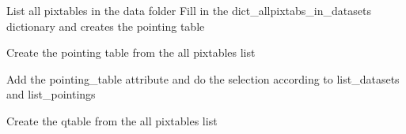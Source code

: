\documentclass[letterpaper,10pt,english]{sphinxmanual}
\begin{document}
\begin{fulllineitems}
\begin{fulllineitems}
\label{\detokenize{api/pymusepipe:pymusepipe.combine.MusePointings.full_list_datasets}}
\pysigstartsignatures
{}
\pysigstopsignatures
\end{fulllineitems}


\begin{fulllineitems}
\label{\detokenize{api/pymusepipe:pymusepipe.combine.MusePointings.get_all_pixtables}}
\pysigstartsignatures
{}
\pysigstopsignatures
\sphinxAtStartPar
List all pixtables in the data folder
Fill in the dict\_allpixtabs\_in\_datasets dictionary and creates the pointing table

\end{fulllineitems}


\begin{fulllineitems}
\label{\detokenize{api/pymusepipe:pymusepipe.combine.MusePointings.get_pointing_table}}
\pysigstartsignatures
{}
\pysigstopsignatures
\sphinxAtStartPar
Create the pointing table from the all pixtables list

\sphinxAtStartPar
Add the pointing\_table attribute and do the selection according to list\_datasets and
list\_pointings

\end{fulllineitems}


\begin{fulllineitems}
\label{\detokenize{api/pymusepipe:pymusepipe.combine.MusePointings.get_qtable}}
\pysigstartsignatures
{}
\pysigstopsignatures
\sphinxAtStartPar
Create the qtable from the all pixtables list


\end{fulllineitems}
\end{fulllineitems}
\end{document}
